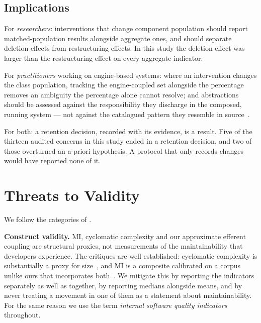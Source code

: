 \documentclass[pdflatex,sn-basic]{sn-jnl}
\begin{document}
\subsection{Implications}

For \emph{researchers}: interventions that change component population should report matched-population results alongside aggregate ones, and should separate deletion effects from restructuring effects. In this study the deletion effect was larger than the restructuring effect on every aggregate indicator.

For \emph{practitioners} working on engine-based systems: where an intervention changes the class population, tracking the engine-coupled set alongside the percentage removes an ambiguity the percentage alone cannot resolve; and abstractions should be assessed against the responsibility they discharge in the composed, running system --- not against the catalogued pattern they resemble in source~\citep{gamma1995}.

For both: a retention decision, recorded with its evidence, is a result. Five of the thirteen audited concerns in this study ended in a retention decision, and two of those overturned an a-priori hypothesis. A protocol that only records changes would have reported none of it.


\FloatBarrier

\section{Threats to Validity}\label{sec:threats}

We follow the categories of \citet{runeson2009}.

\medskip\noindent\textbf{Construct validity.} MI, cyclomatic complexity and our approximate efferent coupling are structural proxies, not measurements of the maintainability that developers experience. The critiques are well established: cyclomatic complexity is substantially a proxy for size~\citep{shepperd1988}, and MI is a composite calibrated on a corpus unlike ours that incorporates both~\citep{coleman1994,ardito2020}. We mitigate this by reporting the indicators separately as well as together, by reporting medians alongside means, and by never treating a movement in one of them as a statement about maintainability. For the same reason we use the term \emph{internal software quality indicators} throughout.
\end{document}
